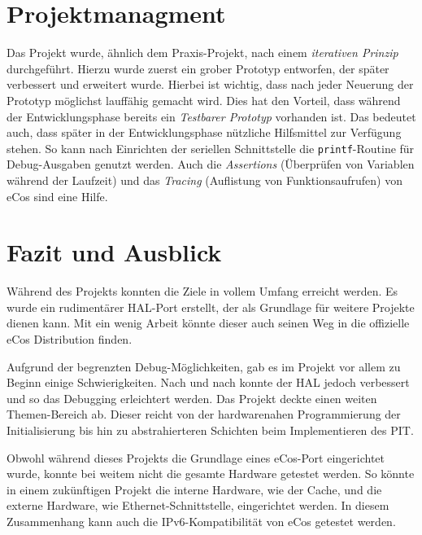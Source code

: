 \documentclass[
  a4paper,					%
  twoside,
  DIV=calc,     				%
  bibliography=totoc,
  cleardoublepage=empty,
  ngerman,     					%
  final       					%
]{scrbook}
\begin{document}
\chapter{Projektmanagment}
\label{sec:Projektmanagment}
Das Projekt wurde, ähnlich dem Praxis-Projekt, nach einem \emph{iterativen Prinzip} durchgeführt. Hierzu wurde zuerst ein grober Prototyp entworfen, der später verbessert und erweitert wurde. Hierbei ist wichtig, dass nach jeder Neuerung der Prototyp möglichst lauffähig gemacht wird. Dies hat den Vorteil, dass während der Entwicklungsphase bereits ein \emph{Testbarer Prototyp} vorhanden ist. Das bedeutet auch, dass später in der Entwicklungsphase nützliche Hilfsmittel zur Verfügung stehen. So kann nach Einrichten der seriellen Schnittstelle die \texttt{printf}-Routine für Debug-Ausgaben genutzt werden. Auch die \emph{Assertions} (Überprüfen von Variablen während der Laufzeit) und das \emph{Tracing} (Auflistung von Funktionsaufrufen) von eCos sind eine Hilfe.








\chapter{Fazit und Ausblick}
\label{sec:FazitAusblick}
Während des Projekts konnten die Ziele in vollem Umfang erreicht werden. Es wurde ein rudimentärer HAL-Port erstellt, der als Grundlage für weitere Projekte dienen kann. Mit ein wenig Arbeit könnte dieser auch seinen Weg in die offizielle eCos Distribution finden.

Aufgrund der begrenzten Debug-Möglichkeiten, gab es im Projekt vor allem zu Beginn einige Schwierigkeiten. Nach und nach konnte der HAL jedoch verbessert und so das Debugging erleichtert werden. Das Projekt deckte einen weiten Themen-Bereich ab. Dieser reicht von der hardwarenahen Programmierung der Initialisierung bis hin zu abstrahierteren Schichten beim Implementieren des PIT.

Obwohl während dieses Projekts die Grundlage eines eCos-Port eingerichtet wurde, konnte bei weitem nicht die gesamte Hardware getestet werden. So könnte in einem zukünftigen Projekt die interne Hardware, wie der Cache, und die externe Hardware, wie Ethernet-Schnittstelle, eingerichtet werden. In diesem Zusammenhang kann auch die IPv6-Kompatibilität von eCos getestet werden.
\end{document}
